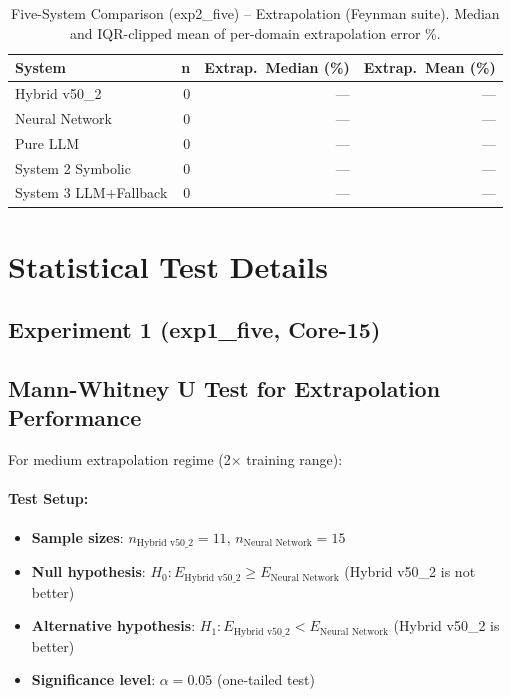 \begin{table}[t]
\centering
\caption{Five-System Comparison (exp2\_five) -- Extrapolation (Feynman
  suite). Median and IQR-clipped mean of per-domain extrapolation error \%.}
\label{tab:five_systems_extrapolation_exp2five}
\begin{tabular}{lrrr}
\toprule
\textbf{System} & \textbf{n}
  & \textbf{Extrap.\ Median (\%)} & \textbf{Extrap.\ Mean (\%)} \\
\midrule
Hybrid v50\_2 & 0 & --- & --- \\
Neural Network & 0 & --- & --- \\
Pure LLM & 0 & --- & --- \\
System 2 Symbolic & 0 & --- & --- \\
System 3 LLM+Fallback & 0 & --- & --- \\
\bottomrule
\end{tabular}
\end{table}

\section{Statistical Test Details}
\label{app:statistical_tests}

\subsection*{Experiment 1 (exp1\_five, Core-15)}

\subsection{Mann-Whitney U Test for Extrapolation Performance}

For medium extrapolation regime (2$\times$ training range):

\paragraph{Test Setup:}
\begin{itemize}
\item \textbf{Sample sizes}: $n_{\text{Hybrid v50\_2}} = 11$, $n_{\text{Neural Network}} = 15$
\item \textbf{Null hypothesis}: $H_0: E_{\text{Hybrid v50\_2}} \geq E_{\text{Neural Network}}$ (Hybrid v50\_2 is not better)
\item \textbf{Alternative hypothesis}: $H_1: E_{\text{Hybrid v50\_2}} < E_{\text{Neural Network}}$ (Hybrid v50\_2 is better)
\item \textbf{Significance level}: $\alpha = 0.05$ (one-tailed test)
\end{itemize}

